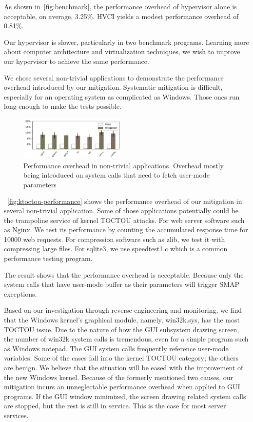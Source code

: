 As shown in~\autoref{fig:benchmark}, the performance overhead of hypervisor alone is acceptable, on average, 3.25\%. HVCI yields a modest performance overhead of 0.81\%.

Our hypervisor is slower, particularly in two benchmark programs. Learning more about computer architecture and virtualization techniques, we wish to improve our hypervisor to achieve the same performance.

We chose several non-trivial applications to demonstrate the performance overhead introduced by our mitigation. Systematic mitigation is difficult, especially for an operating system as complicated as Windows. Those ones run long enough to make the tests possible.

\begin{figure}[th]
  \includegraphics[width=0.47\textwidth]{figures/performance4}
  \centering
  \caption{Performance overhead in non-trivial applications. Overhead mostly being introduced on system calls that need to fetch user-mode parameters}
  \label{fig:ktoctou-performance}
\end{figure}

~\autoref{fig:ktoctou-performance} shows the performance overhead of our mitigation in several non-trivial application. Some of those applications potentially could be the trampoline service of kernel TOCTOU attacks.
For web server software such as Nginx. We test its performance by counting the accumulated response time for 10000 web requests. For compression software such as zlib, we test it with compressing large files. For sqlite3, we use speedtest1.c which is a common performance testing program.

The result shows that the performance overhead is acceptable. Because only the system calls that have user-mode buffer as their parameters will trigger SMAP exceptions. 



Based on our investigation through reverse-engineering and monitoring, we find that the Windows kernel's graphical module, namely, win32k.sys, has the most TOCTOU issue. Due to the nature of how the GUI subsystem drawing screen, the number of win32k system calls is tremendous, even for a simple program such as Windows notepad. The GUI system calls frequently reference user-mode variables. Some of the cases fall into the kernel TOCTOU category; the others are benign. We believe that the situation will be eased with the improvement of the new Windows kernel. Because of the formerly mentioned two causes, our mitigation incurs an unneglectable performance overhead when applied to GUI programs. If the GUI window minimized, the screen drawing related system calls are stopped, but the rest is still in service. This is the case for most server services.


